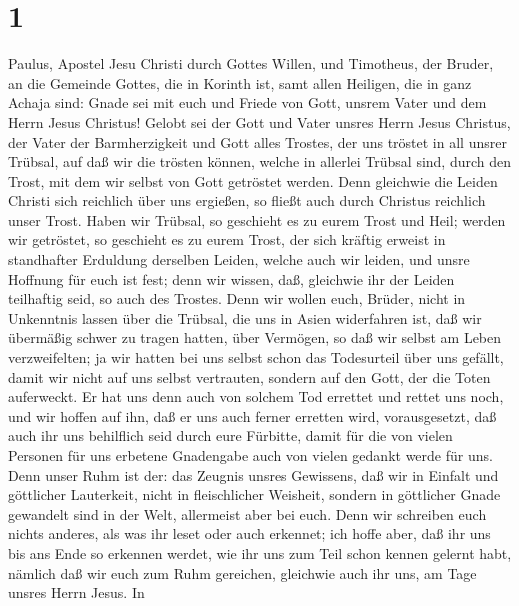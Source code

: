 \hypertarget{section}{%
\section{1}\label{section}}

 Paulus, Apostel Jesu Christi durch Gottes Willen, und
Timotheus, der Bruder, an die Gemeinde Gottes, die in Korinth ist, samt
allen Heiligen, die in ganz Achaja sind:  Gnade sei mit
euch und Friede von Gott, unsrem Vater und dem Herrn Jesus Christus!
 Gelobt sei der Gott und Vater unsres Herrn Jesus
Christus, der Vater der Barmherzigkeit und Gott alles Trostes,
 der uns tröstet in all unsrer Trübsal, auf daß wir die
trösten können, welche in allerlei Trübsal sind, durch den Trost, mit
dem wir selbst von Gott getröstet werden.  Denn gleichwie
die Leiden Christi sich reichlich über uns ergießen, so fließt auch
durch Christus reichlich unser Trost.  Haben wir Trübsal,
so geschieht es zu eurem Trost und Heil; werden wir getröstet, so
geschieht es zu eurem Trost, der sich kräftig erweist in standhafter
Erduldung derselben Leiden, welche auch wir leiden, und unsre Hoffnung
für euch ist fest;  denn wir wissen, daß, gleichwie ihr
der Leiden teilhaftig seid, so auch des Trostes.  Denn wir
wollen euch, Brüder, nicht in Unkenntnis lassen über die Trübsal, die
uns in Asien widerfahren ist, daß wir übermäßig schwer zu tragen hatten,
über Vermögen, so daß wir selbst am Leben verzweifelten; 
ja wir hatten bei uns selbst schon das Todesurteil über uns gefällt,
damit wir nicht auf uns selbst vertrauten, sondern auf den Gott, der die
Toten auferweckt.  Er hat uns denn auch von solchem Tod
errettet und rettet uns noch, und wir hoffen auf ihn, daß er uns auch
ferner erretten wird,  vorausgesetzt, daß auch ihr uns
behilflich seid durch eure Fürbitte, damit für die von vielen Personen
für uns erbetene Gnadengabe auch von vielen gedankt werde für uns.
 Denn unser Ruhm ist der: das Zeugnis unsres Gewissens,
daß wir in Einfalt und göttlicher Lauterkeit, nicht in fleischlicher
Weisheit, sondern in göttlicher Gnade gewandelt sind in der Welt,
allermeist aber bei euch.  Denn wir schreiben euch nichts
anderes, als was ihr leset oder auch erkennet;  ich hoffe
aber, daß ihr uns bis ans Ende so erkennen werdet, wie ihr uns zum Teil
schon kennen gelernt habt, nämlich daß wir euch zum Ruhm gereichen,
gleichwie auch ihr uns, am Tage unsres Herrn Jesus.  In

